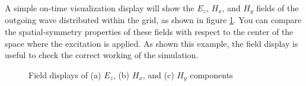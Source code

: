 A simple on-time visualization display will show the $E_z$, $H_x$, and $H_y$ fields of the outgoing wave distributed within the grid, as shown in figure \ref{fig:air2d_field_view}. You can compare the spatial-symmetry properties of these fields with respect to the center of the space where the excitation is applied. As shown this example, the field display is useful to check the correct working of the simulation.

\begin{figure}[hp!]
  \begin{center}
  \end{center}
  \caption{Field displays of (a) $E_z$, (b) $H_x$, and (c) $H_y$ components}
  \label{fig:air2d_field_view}
\end{figure}

